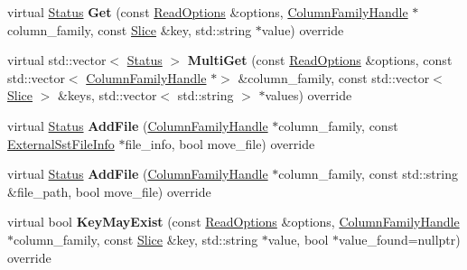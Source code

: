 \begin{DoxyCompactItemize}
\item 
virtual \hyperlink{classrocksdb_1_1Status}{Status} {\bfseries Get} (const \hyperlink{structrocksdb_1_1ReadOptions}{Read\+Options} \&options, \hyperlink{classrocksdb_1_1ColumnFamilyHandle}{Column\+Family\+Handle} $\ast$column\+\_\+family, const \hyperlink{classrocksdb_1_1Slice}{Slice} \&key, std\+::string $\ast$value) override\hypertarget{classrocksdb_1_1StackableDB_abf1d94ddfc53f3eabf5e7ed51febf6d1}{}\label{classrocksdb_1_1StackableDB_abf1d94ddfc53f3eabf5e7ed51febf6d1}

\item 
virtual std\+::vector$<$ \hyperlink{classrocksdb_1_1Status}{Status} $>$ {\bfseries Multi\+Get} (const \hyperlink{structrocksdb_1_1ReadOptions}{Read\+Options} \&options, const std\+::vector$<$ \hyperlink{classrocksdb_1_1ColumnFamilyHandle}{Column\+Family\+Handle} $\ast$$>$ \&column\+\_\+family, const std\+::vector$<$ \hyperlink{classrocksdb_1_1Slice}{Slice} $>$ \&keys, std\+::vector$<$ std\+::string $>$ $\ast$values) override\hypertarget{classrocksdb_1_1StackableDB_a9e68922571e87268b17869549398b92e}{}\label{classrocksdb_1_1StackableDB_a9e68922571e87268b17869549398b92e}

\item 
virtual \hyperlink{classrocksdb_1_1Status}{Status} {\bfseries Add\+File} (\hyperlink{classrocksdb_1_1ColumnFamilyHandle}{Column\+Family\+Handle} $\ast$column\+\_\+family, const \hyperlink{structrocksdb_1_1ExternalSstFileInfo}{External\+Sst\+File\+Info} $\ast$file\+\_\+info, bool move\+\_\+file) override\hypertarget{classrocksdb_1_1StackableDB_a74f336bbef043a33e890f375d0fd2bc4}{}\label{classrocksdb_1_1StackableDB_a74f336bbef043a33e890f375d0fd2bc4}

\item 
virtual \hyperlink{classrocksdb_1_1Status}{Status} {\bfseries Add\+File} (\hyperlink{classrocksdb_1_1ColumnFamilyHandle}{Column\+Family\+Handle} $\ast$column\+\_\+family, const std\+::string \&file\+\_\+path, bool move\+\_\+file) override\hypertarget{classrocksdb_1_1StackableDB_a2177102cbe5a4b6c2d4cd3c2b37524a5}{}\label{classrocksdb_1_1StackableDB_a2177102cbe5a4b6c2d4cd3c2b37524a5}

\item 
virtual bool {\bfseries Key\+May\+Exist} (const \hyperlink{structrocksdb_1_1ReadOptions}{Read\+Options} \&options, \hyperlink{classrocksdb_1_1ColumnFamilyHandle}{Column\+Family\+Handle} $\ast$column\+\_\+family, const \hyperlink{classrocksdb_1_1Slice}{Slice} \&key, std\+::string $\ast$value, bool $\ast$value\+\_\+found=nullptr) override\hypertarget{classrocksdb_1_1StackableDB_af26a9b393aee973c7279b61599fa1220}{}\label{classrocksdb_1_1StackableDB_af26a9b393aee973c7279b61599fa1220}


\end{DoxyCompactItemize}
